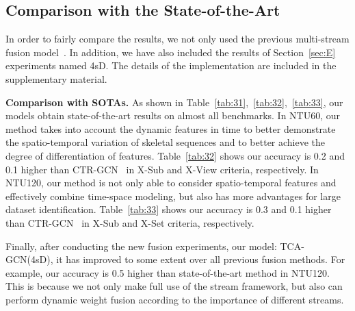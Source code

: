 \documentclass[letterpaper]{article} \usepackage[submission]{aaai23}  \usepackage{times}  \usepackage{helvet}  \usepackage{courier}  \usepackage[hyphens]{url}  \usepackage{graphicx} \urlstyle{rm} \def\UrlFont{\rm}  \usepackage{natbib}  \usepackage{caption} \frenchspacing  \setlength{\pdfpagewidth}{8.5in} \setlength{\pdfpageheight}{11in} \usepackage{algorithm}
\begin{document}
\subsection{Comparison with the State-of-the-Art}
\label{sec:CA}
In order to fairly compare the results, we not only used the previous multi-stream fusion model~\cite{2021Channel,DBLP:conf/cvpr/Cheng0HC0L20,2020Dynamic}. In addition, we have also included the results of Section~\ref{sec:E} experiments named 4sD. The details of the implementation are included in the supplementary material. 

\noindent
{\bf Comparison with SOTAs.} As shown in Table~\ref{tab:31},~\ref{tab:32},~\ref{tab:33}, our models obtain state-of-the-art results on almost all benchmarks. In NTU60, our method takes into account the dynamic features in time to better demonstrate the spatio-temporal variation of skeletal sequences and to better achieve the degree of differentiation of features.
Table~\ref{tab:32} shows our accuracy is 0.2 and 0.1 higher than CTR-GCN~\cite{2021Channel} in X-Sub and X-View criteria, respectively.
In NTU120, our method is not only able to consider spatio-temporal features and effectively combine time-space modeling, but also has more advantages for large dataset identification. Table~\ref{tab:33} shows our accuracy is 0.3 and 0.1 higher than CTR-GCN~\cite{2021Channel} in X-Sub and X-Set criteria, respectively.


Finally, after conducting the new fusion experiments, our model: TCA-GCN(4sD), it has improved to some extent over all previous fusion methods. For example, our accuracy is 0.5 higher than state-of-the-art method in NTU120. This is because we not only make full use of the stream framework, but also can perform dynamic weight fusion according to the importance of different streams.
\end{document}
